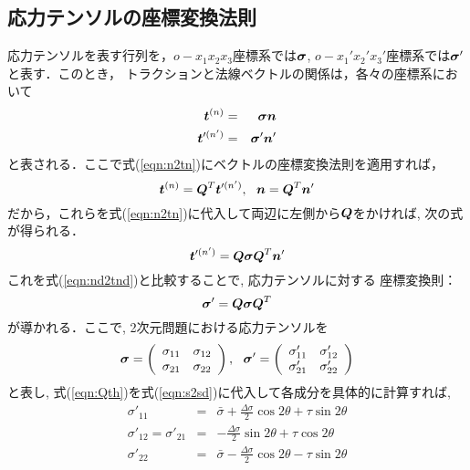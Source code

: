 \documentclass[10pt,a4j]{jarticle}
\begin{document}
\subsection{応力テンソルの座標変換法則}
応力テンソルを表す行列を，$o-x_1x_2x_3$座標系では$\mbox{\boldmath $\sigma$}$, 
$o-x_1'x_2'x_3'$座標系では$\mbox{\boldmath $\sigma$}'$と表す．このとき，
トラクションと法線ベクトルの関係は，各々の座標系において
\begin{eqnarray}
	\mbox{\boldmath $t$}^{(n)} &=& \mbox{\boldmath $\sigma$}\mbox{\boldmath $n$} 
		\label{eqn:n2tn} \\
	\mbox{\boldmath $t$}'^{(n')} &=& \mbox{\boldmath $\sigma$}'\mbox{\boldmath $n$}'
		\label{eqn:nd2tnd} 
\end{eqnarray}
と表される．ここで式(\ref{eqn:n2tn})にベクトルの座標変換法則を適用すれば，
\begin{equation}
	\fat{t}^{(n)}=\fat{Q}^T \fat{t}'^{(n')}, \ \ 
	\fat{n} = \fat{Q}^T \fat{n}'
\end{equation}
だから，これらを式(\ref{eqn:n2tn})に代入して両辺に左側から$\mbox{\boldmath $Q$}$をかければ, 
次の式が得られる．
\begin{equation}
	\mbox{\boldmath $t$}'^{(n')}=\mbox{\boldmath $Q$} \mbox{\boldmath $\sigma$} \mbox{\boldmath $Q$}^T \mbox{\boldmath $n$}'
\end{equation}
これを式(\ref{eqn:nd2tnd})と比較することで, 応力テンソルに対する
座標変換則：
\begin{equation}
	\mbox{\boldmath $\sigma$}'=\mbox{\boldmath $Q$}\mbox{\boldmath $\sigma$}\mbox{\boldmath $Q$}^T
	\label{eqn:s2sd}
\end{equation}
が導かれる．ここで, 2次元問題における応力テンソルを
\begin{equation}
	\fat{\sigma}=\left(
		\begin{array}{cc}
		 \sigma_{11} & \sigma_{12} \\
		 \sigma_{21} & \sigma_{22} 
		\end{array}
	\right)
	, \ \ 
	\fat{\sigma}'=\left(
		\begin{array}{cc}
	 \sigma'_{11} & \sigma'_{12} \\
	 \sigma'_{21} & \sigma'_{22} 
	\end{array}
	\right)
\end{equation}
と表し, 式(\ref{eqn:Qth})を式(\ref{eqn:s2sd})に代入して各成分を具体的に計算すれば, 
\begin{eqnarray}
	\sigma'_{11} &=& \bar{\sigma} + \frac{\Delta \sigma}{2} \cos 2\theta + \tau \sin 2\theta
		\label{eqn:s11d} \\
	\sigma'_{12}=\sigma'_{21} &=& - \frac{\Delta \sigma}{2} \sin 2\theta + \tau \cos 2\theta
		\label{eqn:s12d} \\
	\sigma'_{22} &=& \bar{\sigma} - \frac{\Delta \sigma}{2} \cos 2\theta - \tau \sin 2\theta 
		\label{eqn:s22d}
\end{eqnarray}
\end{document}

